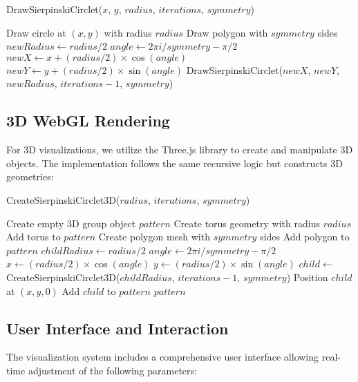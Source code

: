 \documentclass[12pt,a4paper]{article}
\begin{document}
\begin{algorithm}
\caption{DrawSierpinskiCirclet($x$, $y$, $radius$, $iterations$, $symmetry$)}
\begin{algorithmic}[1]
    \RETURN
\ENDIF
\STATE Draw circle at $(x, y)$ with radius $radius$
\STATE Draw polygon with $symmetry$ sides
    \STATE $newRadius \gets radius / 2$
        \STATE $angle \gets 2\pi i / symmetry - \pi/2$
        \STATE $newX \gets x + (radius/2) \times \cos(angle)$
        \STATE $newY \gets y + (radius/2) \times \sin(angle)$
        \STATE DrawSierpinskiCirclet($newX$, $newY$, $newRadius$, $iterations - 1$, $symmetry$)
    \ENDFOR
\ENDIF
\end{algorithmic}
\end{algorithm}

\subsection{3D WebGL Rendering}
For 3D visualizations, we utilize the Three.js library to create and manipulate 3D objects. The implementation follows the same recursive logic but constructs 3D geometries:

\begin{algorithm}
\caption{CreateSierpinskiCirclet3D($radius$, $iterations$, $symmetry$)}
\begin{algorithmic}[1]
\STATE Create empty 3D group object $pattern$
\STATE Create torus geometry with radius $radius$
\STATE Add torus to $pattern$
    \STATE Create polygon mesh with $symmetry$ sides
    \STATE Add polygon to $pattern$
        \STATE $childRadius \gets radius / 2$
            \STATE $angle \gets 2\pi i / symmetry - \pi/2$
            \STATE $x \gets (radius/2) \times \cos(angle)$
            \STATE $y \gets (radius/2) \times \sin(angle)$
            \STATE $child \gets$ CreateSierpinskiCirclet3D($childRadius$, $iterations - 1$, $symmetry$)
            \STATE Position $child$ at $(x, y, 0)$
            \STATE Add $child$ to $pattern$
        \ENDFOR
    \ENDIF
\ENDIF
\RETURN $pattern$
\end{algorithmic}
\end{algorithm}

\subsection{User Interface and Interaction}
The visualization system includes a comprehensive user interface allowing real-time adjustment of the following parameters:
\end{document}
